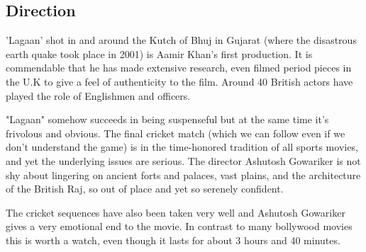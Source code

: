 \documentclass[a4paper]{article}
\begin{document}
\subsection{Direction}
'Lagaan' shot in and around the Kutch of Bhuj in Gujarat (where the disastrous earth quake took place in 2001) is Aamir Khan's first production. It is commendable that he has made extensive research, even filmed period pieces in the U.K to give a feel of authenticity to the film. Around 40 British actors have played the role of Englishmen and officers.

"Lagaan" somehow succeeds in being suspenseful but at the same time it's frivolous and obvious. The final cricket match (which we can follow even if we don't understand the game) is in the time-honored tradition of all sports movies, and yet the underlying issues are serious. The director Ashutosh Gowariker is not shy about lingering on ancient forts and palaces, vast plains, and the architecture of the British Raj, so out of place and yet so serenely confident.

The cricket sequences have also been taken very well and Ashutosh Gowariker gives a very emotional end to the movie. In contrast to many bollywood movies this is worth a watch, even though it lasts for about 3 hours and 40 minutes.
	  

	  
\end{document}

